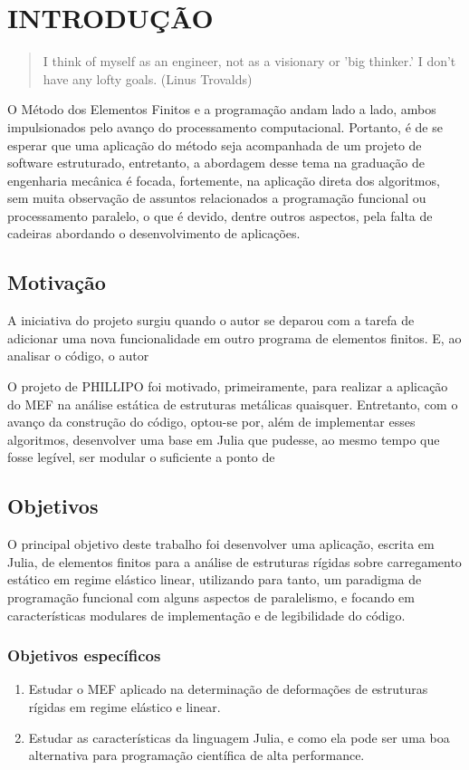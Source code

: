 

\chapter{INTRODUÇÃO}

\begin{quote}
    I think of myself as an engineer, not as a visionary or 'big thinker.' I don't have any lofty goals.
    (Linus Trovalds)  
\end{quote}


O Método dos Elementos Finitos e a programação andam lado a lado, ambos impulsionados pelo avanço do processamento computacional. Portanto, é de se esperar que uma aplicação do método seja acompanhada de um projeto de software estruturado, entretanto, a abordagem desse tema na graduação de engenharia mecânica é focada, fortemente, na aplicação direta dos algoritmos, sem muita observação de assuntos relacionados a programação funcional ou processamento paralelo, o que é devido, dentre outros aspectos, pela falta de cadeiras abordando o desenvolvimento de aplicações. 

\section{Motivação}

A iniciativa do projeto surgiu quando o autor se deparou com a tarefa de adicionar uma nova funcionalidade em outro programa de elementos finitos. E, ao analisar o código, o autor 

O projeto de PHILLIPO foi motivado, primeiramente, para realizar a aplicação do MEF na análise estática de estruturas metálicas quaisquer. Entretanto, com o avanço da construção do código, optou-se por, além de implementar esses algoritmos, desenvolver uma base em Julia que pudesse, ao mesmo tempo que fosse legível, ser modular o suficiente a ponto de 

\section{Objetivos}

O principal objetivo deste trabalho foi desenvolver uma aplicação, escrita em Julia, de elementos finitos para a análise de estruturas rígidas sobre carregamento estático em regime elástico linear, utilizando para tanto, um paradigma de programação funcional com alguns aspectos de paralelismo, e focando em características modulares de implementação e de legibilidade do código.

\subsection{Objetivos específicos}

\begin{enumerate}
    \item Estudar o MEF aplicado na determinação de deformações de estruturas rígidas em regime elástico e linear.
    \item Estudar as características da linguagem Julia, e como ela pode ser uma boa alternativa para programação científica de alta performance.
\end{enumerate}